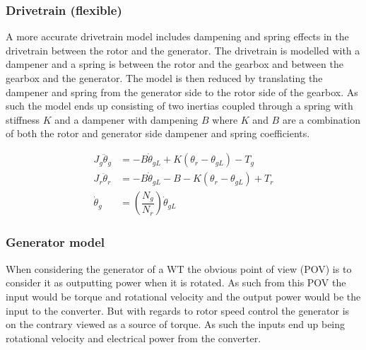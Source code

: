 \subsubsection{Drivetrain (flexible)}
A more accurate drivetrain model includes dampening and spring effects in the drivetrain between the rotor and the generator. The drivetrain is modelled with a dampener and a spring is between the rotor and the gearbox and between the gearbox and the generator. The model is then reduced by translating the dampener and spring from the generator side to the rotor side of the gearbox. As such the model ends up consisting of two inertias coupled through a spring with stiffness $ K $ and a dampener with dampening $ B $ where $ K $ and $ B $ are a combination of both the rotor and generator side dampener and spring coefficients. 

\begin{align} 
	J_{g} \ddot{\theta}_g & = -B \dot{\theta}_{gL} + K(\theta_r - \theta_{gL}) - T_{g} \label{eq:wtlin_comp_drivetrain_flex_1} \\
	J_{r} \ddot{\theta}_r & = -B \dot{\theta}_{gL} -B - K(\theta_r - \theta_{gL}) + T_{r} \label{eq:wtlin_comp_drivetrain_flex_2} \\
	\dot{\theta}_g & = \left(\dfrac{N_g}{N_r}\right) \dot{\theta}_{gL} \label{eq:wtlin_comp_drivetrain_flex_3}
\end{align}

\clearpage \newpage
\subsubsection{Generator model}
When considering the generator of a WT the obvious point of view (POV) is to consider it as outputting power when it is rotated. As such from this POV the input would be torque and rotational velocity and the output power would be the input to the converter. But with regards to rotor speed control the generator is on the contrary viewed as a source of torque. As such the inputs end up being rotational velocity and electrical power from the converter.

